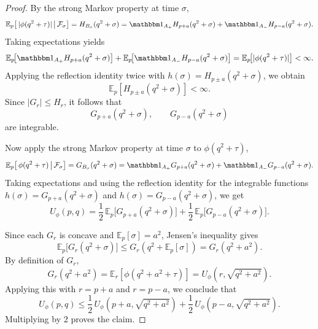 \documentclass[11pt]{amsart}
\theoremstyle{definition}
\renewcommand{\1}{{\mathbbm{1}}}
\begin{document}
\begin{proof}
By the strong Markov property at time $\sigma$,
\[
\mathbb E_p\!\left[\,|\phi(q^2+\tau)|\,\middle|\,\mathcal F_\sigma\right]
=
H_{B_\sigma}(q^2+\sigma)
=
\mathbbm 1_{A_+}H_{p+a}(q^2+\sigma)
+
\mathbbm 1_{A_-}H_{p-a}(q^2+\sigma).
\]
Taking expectations yields
\[
\mathbb E_p\!\bigl[\mathbbm 1_{A_+}H_{p+a}(q^2+\sigma)\bigr]
+
\mathbb E_p\!\bigl[\mathbbm 1_{A_-}H_{p-a}(q^2+\sigma)\bigr]
=
\mathbb E_p\!\bigl[|\phi(q^2+\tau)|\bigr]
<\infty.
\]
Applying the reflection identity twice with
$h(\sigma)=H_{p\pm a}(q^2+\sigma)$, we obtain
\[
\mathbb E_p[H_{p\pm a}(q^2+\sigma)]<\infty.
\]
Since $|G_r|\le H_r$, it follows that
\[
G_{p+a}(q^2+\sigma),\qquad G_{p-a}(q^2+\sigma)
\]
are integrable.

Now apply the strong Markov property at time $\sigma$ to $\phi(q^2+\tau)$,
\[
\mathbb E_p\!\left[\,\phi(q^2+\tau)\,\middle|\,\mathcal F_\sigma\right]
=
G_{B_\sigma}(q^2+\sigma)
=
\mathbbm 1_{A_+}G_{p+a}(q^2+\sigma)
+
\mathbbm 1_{A_-}G_{p-a}(q^2+\sigma).
\]
Taking expectations and using the reflection identity for the integrable
functions $h(\sigma)=G_{p+a}(q^2+\sigma)$ and
$h(\sigma)=G_{p-a}(q^2+\sigma)$, we get
\[
U_\phi(p,q)
=
\frac12\,\mathbb E_p\!\bigl[G_{p+a}(q^2+\sigma)\bigr]
+
\frac12\,\mathbb E_p\!\bigl[G_{p-a}(q^2+\sigma)\bigr].
\]

Since each $G_r$ is concave and $\mathbb E_p[\sigma]=a^2$, Jensen's inequality
gives
\[
\mathbb E_p\!\bigl[G_r(q^2+\sigma)\bigr]
\le
G_r(q^2+\mathbb E_p[\sigma])
=
G_r(q^2+a^2).
\]
By definition of $G_r$,
\[
G_r(q^2+a^2)
=
\mathbb E_r[\phi(q^2+a^2+\tau)]
=
U_\phi\!\left(r,\sqrt{q^2+a^2}\right).
\]
Applying this with $r=p+a$ and $r=p-a$, we conclude that
\[
U_\phi(p,q)
\le
\frac12\,U_\phi\!\left(p+a,\sqrt{q^2+a^2}\right)
+
\frac12\,U_\phi\!\left(p-a,\sqrt{q^2+a^2}\right).
\]
Multiplying by $2$ proves the claim.
\end{proof}



\end{document}
